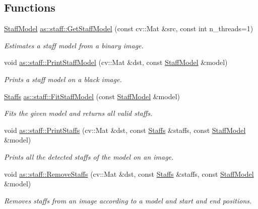 \subsection*{Functions}
\begin{DoxyCompactItemize}
\item 
\hyperlink{structStaffModel}{Staff\+Model} \hyperlink{namespaceas_1_1staff_adc528d054888cbe3b9da25286da8aef6}{as\+::staff\+::\+Get\+Staff\+Model} (const cv\+::\+Mat \&src, const int n\+\_\+threads=1)
\begin{DoxyCompactList}\small\item\em Estimates a staff model from a binary image. \end{DoxyCompactList}\item 
void \hyperlink{namespaceas_1_1staff_a9c48cfcf1c17cad08ed233fe90d05839}{as\+::staff\+::\+Print\+Staff\+Model} (cv\+::\+Mat \&dst, const \hyperlink{structStaffModel}{Staff\+Model} \&model)
\begin{DoxyCompactList}\small\item\em Prints a staff model on a black image. \end{DoxyCompactList}\item 
\hyperlink{staff_8hh_acfffa1dd2bf9ce5820435e63446a7c90}{Staffs} \hyperlink{namespaceas_1_1staff_a8a53d0c0106d677e72ae36edb5bbd760}{as\+::staff\+::\+Fit\+Staff\+Model} (const \hyperlink{structStaffModel}{Staff\+Model} \&model)
\begin{DoxyCompactList}\small\item\em Fits the given model and returns all valid staffs. \end{DoxyCompactList}\item 
void \hyperlink{namespaceas_1_1staff_a5209861cdb891c8a12b5ef43784fac77}{as\+::staff\+::\+Print\+Staffs} (cv\+::\+Mat \&dst, const \hyperlink{staff_8hh_acfffa1dd2bf9ce5820435e63446a7c90}{Staffs} \&staffs, const \hyperlink{structStaffModel}{Staff\+Model} \&model)
\begin{DoxyCompactList}\small\item\em Prints all the detected staffs of the model on an image. \end{DoxyCompactList}\item 
void \hyperlink{namespaceas_1_1staff_ae06eef6c527f2a2919cc8344394fc80c}{as\+::staff\+::\+Remove\+Staffs} (cv\+::\+Mat \&dst, const \hyperlink{staff_8hh_acfffa1dd2bf9ce5820435e63446a7c90}{Staffs} \&staffs, const \hyperlink{structStaffModel}{Staff\+Model} \&model)
\begin{DoxyCompactList}\small\item\em Removes staffs from an image according to a model and start and end positions. \end{DoxyCompactList}\item 

\end{DoxyCompactItemize}

